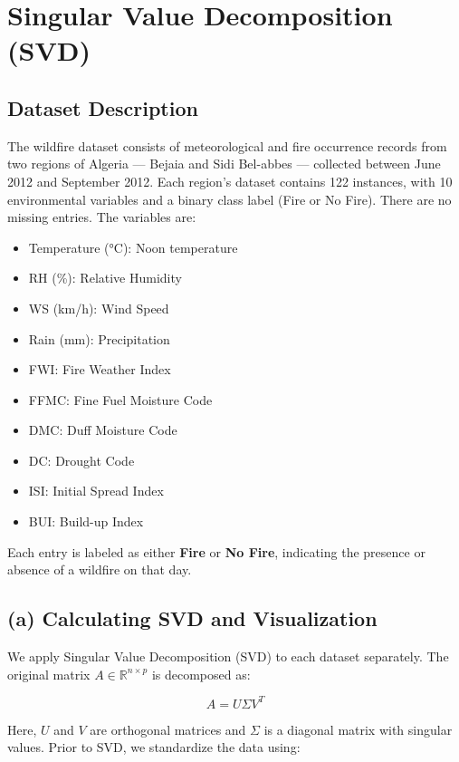 \documentclass[12pt]{article}
\begin{document}
\newpage

\section*{Singular Value Decomposition (SVD)}

\subsection*{Dataset Description}

The wildfire dataset consists of meteorological and fire occurrence records from two regions of Algeria — Bejaia and Sidi Bel-abbes — collected between June 2012 and September 2012. Each region's dataset contains 122 instances, with 10 environmental variables and a binary class label (Fire or No Fire). There are no missing entries. The variables are:

\begin{itemize}
    \item Temperature (°C): Noon temperature
    \item RH (\%): Relative Humidity
    \item WS (km/h): Wind Speed
    \item Rain (mm): Precipitation
    \item FWI: Fire Weather Index
    \item FFMC: Fine Fuel Moisture Code
    \item DMC: Duff Moisture Code
    \item DC: Drought Code
    \item ISI: Initial Spread Index
    \item BUI: Build-up Index
\end{itemize}

Each entry is labeled as either \textbf{Fire} or \textbf{No Fire}, indicating the presence or absence of a wildfire on that day.

\subsection*{(a) Calculating SVD and Visualization}

We apply Singular Value Decomposition (SVD) to each dataset separately. The original matrix \( A \in \mathbb{R}^{n \times p} \) is decomposed as:

\[
A = U \Sigma V^T
\]

Here, \( U \) and \( V \) are orthogonal matrices and \( \Sigma \) is a diagonal matrix with singular values. Prior to SVD, we standardize the data using:
\end{document}
